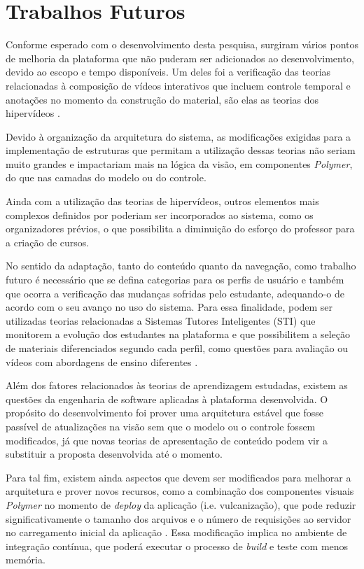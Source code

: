 \section*{Trabalhos Futuros}

Conforme esperado com o desenvolvimento desta pesquisa, surgiram vários pontos de melhoria da plataforma que não puderam ser adicionados ao desenvolvimento, devido ao escopo e tempo disponíveis. Um deles foi a verificação das teorias relacionadas à composição de vídeos interativos que incluem controle temporal e anotações no momento da construção do material, são elas as teorias dos hipervídeos \cite{Sadallah2012}.

Devido à organização da arquitetura do sistema, as modificações exigidas para a implementação de estruturas que permitam a utilização dessas teorias não seriam muito grandes e impactariam mais na lógica da visão, em componentes \textit{Polymer}, do que nas camadas do modelo ou do controle.

Ainda com a utilização das teorias de hipervídeos, outros elementos mais complexos definidos por  poderiam ser incorporados ao sistema, como os organizadores prévios, o que possibilita a diminuição do esforço do professor para a criação de cursos.

No sentido da adaptação, tanto do conteúdo quanto da navegação, como trabalho futuro é necessário que se defina categorias para os perfis de usuário e também que ocorra a verificação das mudanças sofridas pelo estudante, adequando-o de acordo com o seu avanço no uso do sistema. Para essa finalidade, podem ser utilizadas teorias relacionadas a Sistemas Tutores Inteligentes (STI) que monitorem a evolução dos estudantes na plataforma e que possibilitem a seleção de materiais diferenciados segundo cada perfil, como questões para avaliação ou vídeos com abordagens de ensino diferentes \cite{fragelli2010}.

Além dos fatores relacionados às teorias de aprendizagem estudadas, existem as questões da engenharia de software aplicadas à plataforma desenvolvida. O propósito do desenvolvimento foi prover uma arquitetura estável que fosse passível de atualizações na visão sem que o modelo ou o controle fossem modificados, já que novas teorias de apresentação de conteúdo podem vir a substituir a proposta desenvolvida até o momento.

Para tal fim, existem ainda aspectos que devem ser modificados para melhorar a arquitetura e prover novos recursos, como a combinação dos componentes visuais \textit{Polymer} no momento de \textit{deploy} da aplicação (i.e. vulcanização), que pode reduzir significativamente o tamanho dos arquivos e o número de requisições ao servidor no carregamento inicial da aplicação \cite{vulcanize2013}. Essa modificação implica no ambiente de integração contínua, que poderá executar o processo de \textit{build} e teste com menos memória.

